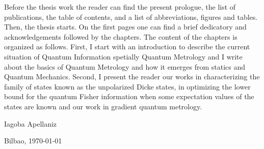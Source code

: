 Before the thesis work the reader can find the present prologue, the list of publications, the table of contents, and a list of abbreviations, figures and tables.
Then, the thesis starts.
On the first pages one can find a brief dedicatory and acknowledgements followed by the chapters.
The content of the chapters is organized as follows.
First, I start with an introduction to describe the current situation of Quantum Information spetially Quantum Metrology and I write about the basics of Quantum Metrology and how it emerges from statics and Quantum Mechanics.
Second, I present the reader our works in characterizing the family of states known as the unpolarized Dicke states, in optimizing the lower bound for the quantum Fisher information when some expectation values of the states are known and our work in gradient quantum metrology.

\begin{flushright}
  Iagoba Apellaniz

  Bilbao, \today
\end{flushright}
